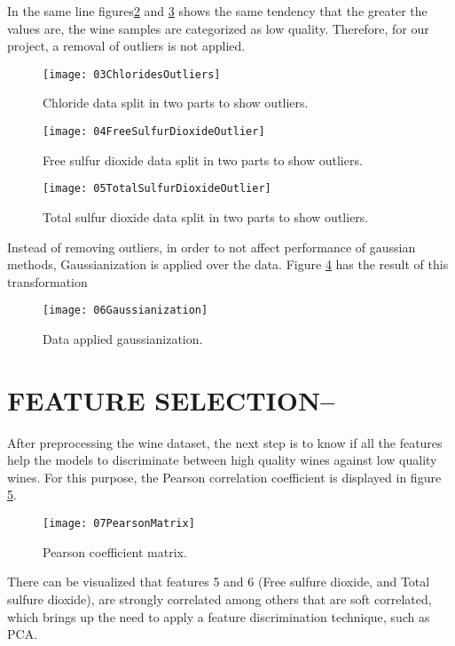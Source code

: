 \documentclass[12pt, twocolumn]{article}
\begin{document}
  In the same line figures\ref{fig:04freesulfurdioxideoutlier} and
  \ref{fig:05totalsulfurdioxideoutlier} shows the same tendency that the
  greater
  the values are, the wine samples are categorized as low quality.
  Therefore, for our project, a removal of outliers is not applied.

  \begin{figure}[!ht]
    \centering
    \texttt{[image: 03ChloridesOutliers]}
    \caption{Chloride data split in two parts to show outliers.}
    \label{fig:03chloridesoutliers}
  \end{figure}
  \begin{figure}[ht]
    \centering
    \texttt{[image: 04FreeSulfurDioxideOutlier]}
    \caption{Free sulfur dioxide data split in two parts to show outliers.}
    \label{fig:04freesulfurdioxideoutlier}
  \end{figure}
  \begin{figure}[ht]
    \centering
    \texttt{[image: 05TotalSulfurDioxideOutlier]}
    \caption{Total sulfur dioxide data split in two parts to show outliers.}
    \label{fig:05totalsulfurdioxideoutlier}
  \end{figure}
  Instead of removing outliers, in order to not affect performance of gaussian
  methods, Gaussianization is applied over the data.
  Figure \ref{fig:06Gaussianization} has the result of this transformation
  \begin{figure}[h!]
    \centering
    \texttt{[image: 06Gaussianization]}
    \caption{Data applied gaussianization.}
    \label{fig:06Gaussianization}
  \end{figure}


  \section{FEATURE SELECTION--}
  After preprocessing the wine dataset, the next step is to know if all the
  features help the models to discriminate between high quality wines against
  low quality wines.
  For this purpose, the Pearson correlation coefficient is displayed in figure
  \ref{fig:07PearsonMatrix}.
  
\begin{figure}[h]
    \centering
    \texttt{[image: 07PearsonMatrix]}
    \caption{Pearson coefficient matrix.}
    \label{fig:07PearsonMatrix}
  \end{figure}

  There can be visualized that features 5 and 6 (Free sulfure dioxide, and
  Total sulfure dioxide), are strongly correlated among others that are soft
  correlated, which brings up the need to apply a feature discrimination
  technique, such as PCA.
\end{document}
